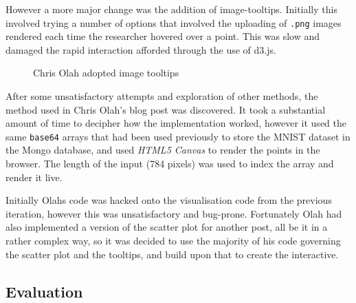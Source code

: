 \documentclass[a4paper,11pt,titlepage]{article}
\begin{document}
	However a more major change was the addition of image-tooltips. Initially this involved trying a number of options that involved the uploading of \texttt{.png} images rendered each time the researcher hovered over a point. This was slow and damaged the rapid interaction afforded through the use of d3.js. 
	
	\begin{figure}[H]
    			\caption{Chris Olah adopted image tooltips}%
	\end{figure}	
	
	\par 
	After some unsatisfactory attempts and exploration of other methods, the method used in Chris Olah's blog post \cite{Olah2014c} was discovered. It took a substantial amount of time to decipher how the implementation worked, however it used the same \texttt{base64} arrays that had been used previously to store the MNIST dataset in the Mongo database, and used \textit{HTML5 Canvas} to render the points in the browser. The length of the input (784 pixels) was used to index the array and render it live.
	\par 
	Initially Olahs code was hacked onto the visualisation code from the previous iteration, however this was unsatisfactory and bug-prone. Fortunately Olah had also implemented a version of the scatter plot for another post, all be it in a rather complex way, so it was decided to use the majority of his code governing the scatter plot and the tooltips, and build upon that to create the interactive.	

	\subsection{Evaluation}
\end{document}
